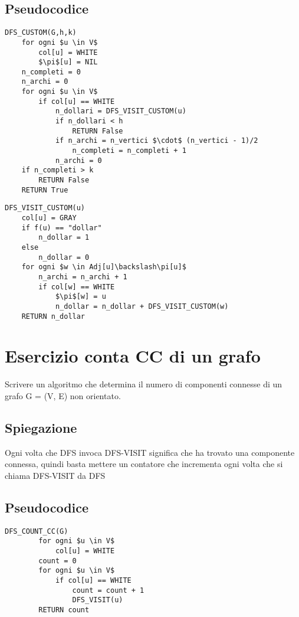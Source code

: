 \documentclass[12pt, a4paper, openany]{book}
\begin{document}
\subsection*{Pseudocodice}
\begin{lstlisting}[mathescape=true]
DFS_CUSTOM(G,h,k)
    for ogni $u \in V$
        col[u] = WHITE
        $\pi$[u] = NIL
    n_completi = 0
    n_archi = 0
    for ogni $u \in V$
        if col[u] == WHITE
            n_dollari = DFS_VISIT_CUSTOM(u)
            if n_dollari < h
                RETURN False
            if n_archi = n_vertici $\cdot$ (n_vertici - 1)/2
                n_completi = n_completi + 1
            n_archi = 0
    if n_completi > k
        RETURN False
    RETURN True
\end{lstlisting}

\begin{lstlisting}[mathescape=true]
DFS_VISIT_CUSTOM(u)
    col[u] = GRAY
    if f(u) == "dollar"
        n_dollar = 1
    else
        n_dollar = 0
    for ogni $w \in Adj[u]\backslash\pi[u]$
        n_archi = n_archi + 1
        if col[w] == WHITE
            $\pi$[w] = u
            n_dollar = n_dollar + DFS_VISIT_CUSTOM(w)
    RETURN n_dollar
\end{lstlisting}

\section{Esercizio conta CC di un grafo}
Scrivere un algoritmo che determina il numero di componenti connesse di un grafo G =
(V, E) non orientato.

\subsection*{Spiegazione}
Ogni volta che DFS invoca DFS-VISIT significa che ha trovato una componente connessa, quindi basta mettere un contatore che incrementa ogni volta che si chiama DFS-VISIT da DFS
\subsection*{Pseudocodice}
	\begin{lstlisting}[mathescape=true]
    DFS_COUNT_CC(G)
        for ogni $u \in V$
            col[u] = WHITE
        count = 0
        for ogni $u \in V$
            if col[u] == WHITE
                count = count + 1
                DFS_VISIT(u)
        RETURN count
\end{lstlisting}
\end{document}
